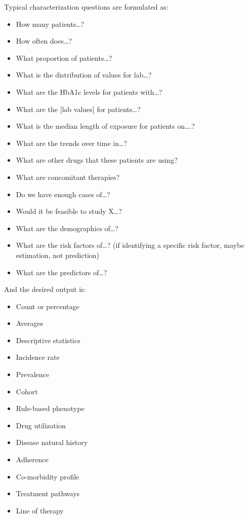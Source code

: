 \documentclass[11pt]{book}
\providecommand{\tightlist}{%
  \setlength{\itemsep}{0pt}\setlength{\parskip}{0pt}}
\theoremstyle{definition}
\theoremstyle{definition}
\theoremstyle{definition}
\theoremstyle{remark}
\begin{document}
Typical characterization questions are formulated as:

\begin{itemize}
\tightlist
\item
  How many patients\ldots?
\item
  How often does\ldots?
\item
  What proportion of patients\ldots?
\item
  What is the distribution of values for lab\ldots?
\item
  What are the HbA1c levels for patients with\ldots?
\item
  What are the {[}lab values{]} for patients\ldots?
\item
  What is the median length of exposure for patients on\ldots.?
\item
  What are the trends over time in\ldots?
\item
  What are other drugs that these patients are using?
\item
  What are concomitant therapies?
\item
  Do we have enough cases of\ldots?
\item
  Would it be feasible to study X\ldots?
\item
  What are the demographics of\ldots?
\item
  What are the risk factors of\ldots? (if identifying a specific risk factor, maybe estimation, not prediction)
\item
  What are the predictors of\ldots?
\end{itemize}

And the desired output is:

\begin{itemize}
\tightlist
\item
  Count or percentage
\item
  Averages
\item
  Descriptive statistics
\item
  Incidence rate
\item
  Prevalence
\item
  Cohort
\item
  Rule-based phenotype
\item
  Drug utilization
\item
  Disease natural history
\item
  Adherence
\item
  Co-morbidity profile
\item
  Treatment pathways
\item
  Line of therapy
\end{itemize}
\end{document}
